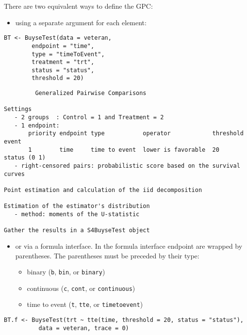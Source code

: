 \documentclass[12pt]{article}
\begin{document}
\bigskip

There are two equivalent ways to define the GPC: 
\begin{itemize}
\item using a separate argument for each element:
\end{itemize}

\lstset{language=r,label= ,caption= ,captionpos=b,numbers=none}
\begin{lstlisting}
BT <- BuyseTest(data = veteran, 
		endpoint = "time", 
		type = "timeToEvent", 
		treatment = "trt", 
		status = "status", 
		threshold = 20)
\end{lstlisting}

\begin{verbatim}
         Generalized Pairwise Comparisons

Settings 
   - 2 groups  : Control = 1 and Treatment = 2
   - 1 endpoint: 
       priority endpoint type           operator            threshold event       
       1        time     time to event  lower is favorable  20        status (0 1)
   - right-censored pairs: probabilistic score based on the survival curves 

Point estimation and calculation of the iid decomposition

Estimation of the estimator's distribution 
   - method: moments of the U-statistic

Gather the results in a S4BuyseTest object
\end{verbatim}

\clearpage

\begin{itemize}
\item or via a formula interface. In the formula interface endpoint are
wrapped by parentheses. The parentheses must be preceded by their
type: 
\begin{itemize}[label={-}]
\item binary (\texttt{b}, \texttt{bin}, or \texttt{binary})
\item continuous (\texttt{c}, \texttt{cont}, or  \texttt{continuous})
\item time to event (\texttt{t}, \texttt{tte}, or \texttt{timetoevent})
\end{itemize}
\end{itemize}

\lstset{language=r,label= ,caption= ,captionpos=b,numbers=none}
\begin{lstlisting}
BT.f <- BuyseTest(trt ~ tte(time, threshold = 20, status = "status"),
		  data = veteran, trace = 0)
\end{lstlisting}
\end{document}
